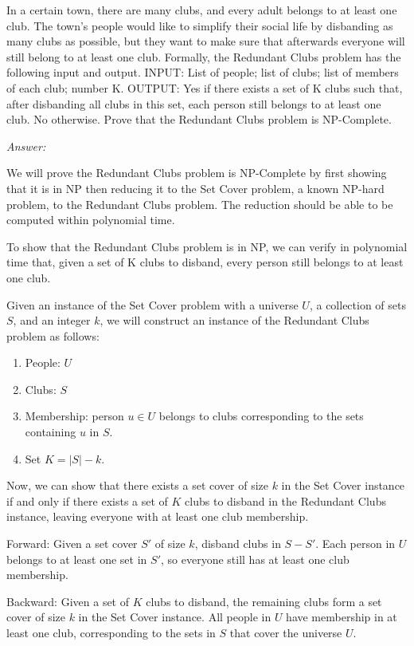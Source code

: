 \documentclass[12pt]{article}
\newenvironment{problem}[2][Problem]{\begin{trivlist}
\item[\hskip \labelsep {\bfseries #1}\hskip \labelsep {\bfseries #2.}]}{\end{trivlist}}
\begin{document}
\begin{problem}{4}
    In a certain town, there are many clubs, and every adult belongs to at least one club. The town's people would like to simplify their social life by disbanding as many clubs as possible, but they want to make sure that afterwards everyone will still belong to at least one club. Formally, the Redundant Clubs problem has the following input and output. INPUT: List of people; list of clubs; list of members of each club; number K. OUTPUT: Yes if there exists a set of K clubs such that, after disbanding all clubs in this set, each person still belongs to at least one club. No otherwise. Prove that the Redundant Clubs problem is NP-Complete.
\end{problem}

\textit{Answer:} 

We will prove the Redundant Clubs problem is NP-Complete by first showing that it is in NP then reducing it to the Set Cover problem, a known NP-hard problem, to the Redundant Clubs problem. The reduction should be able to be computed within polynomial time.

To show that the Redundant Clubs problem is in NP, we can verify in polynomial time that, given a set of K clubs to disband, every person still belongs to at least one club.

Given an instance of the Set Cover problem with a universe $U$, a collection of sets $S$, and an integer $k$, we will construct an instance of the Redundant Clubs problem as follows:
\begin{enumerate}
    \item People: $U$
    \item Clubs: $S$
    \item Membership: person $u \in U$ belongs to clubs corresponding to the sets containing $u$ in $S$.
    \item Set $K = |S| - k$.
\end{enumerate}

Now, we can show that there exists a set cover of size $k$ in the Set Cover instance if and only if there exists a set of $K$ clubs to disband in the Redundant Clubs instance, leaving everyone with at least one club membership.

Forward: Given a set cover $S'$ of size $k$, disband clubs in $S - S'$. Each person in $U$ belongs to at least one set in $S'$, so everyone still has at least one club membership.

Backward: Given a set of $K$ clubs to disband, the remaining clubs form a set cover of size $k$ in the Set Cover instance. All people in $U$ have membership in at least one club, corresponding to the sets in $S$ that cover the universe $U$.
\end{document}
